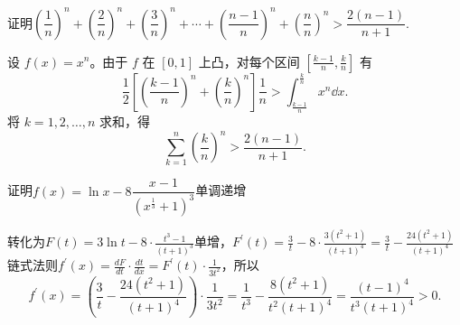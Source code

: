 \begin{example}
    证明$\left(\dfrac{1}{n}\right)^n+\left(\dfrac{2}{n}\right)^n+\left(\dfrac{3}{n}\right)^n+\cdots+\left(\dfrac{n-1}{n}\right)^n+\left(\dfrac{n}{n}\right)^n>\dfrac{2(n-1)}{n+1}$.
\end{example}
\begin{solution}
    设 \(f(x)=x^n\)。由于 \(f\) 在 \([0,1]\) 上凸，对每个区间 \(\left[\frac{k-1}{n},\frac{k}{n}\right]\) 有
    \[
    \frac12\left[\left(\frac{k-1}{n}\right)^n+\left(\frac{k}{n}\right)^n\right]\frac1n>\int_{\frac{k-1}{n}}^{\frac{k}{n}}x^n\dd x.
    \]
    将 \(k=1,2,\dots,n\) 求和，得
    \[
    \sum_{k=1}^n\left(\frac{k}{n}\right)^n>\frac{2(n-1)}{n+1}.
    \]
\end{solution}
\begin{example}
    证明$f(x)=\ln x-8\dfrac{x-1}{(x^{\frac13}+1)^3}$单调递增
\end{example}
\begin{solution}
    转化为$\displaystyle F(t)=3\ln t-8\cdot\frac{t^3-1}{(t+1)^3}$单增，$\displaystyle F^{\prime}(t)=\frac{3}{t}-8\cdot\frac{3(t^2+1)}{(t+1)^4}=\frac{3}{t}-\frac{24(t^2+1)}{(t+1)^4}$
    链式法则$f^{\prime}(x)=\frac{dF}{dt}\cdot\frac{dt}{dx}=F^{\prime}(t)\cdot\frac{1}{3t^2}$，所以\[f^{\prime}(x)=\left(\frac{3}{t}-\frac{24(t^2+1)}{(t+1)^4}\right)\cdot\frac{1}{3t^2}=\frac{1}{t^3}-\frac{8(t^2+1)}{t^2(t+1)^4}=\frac{(t-1)^4}{t^3(t+1)^4}>0.\]
\end{solution}

